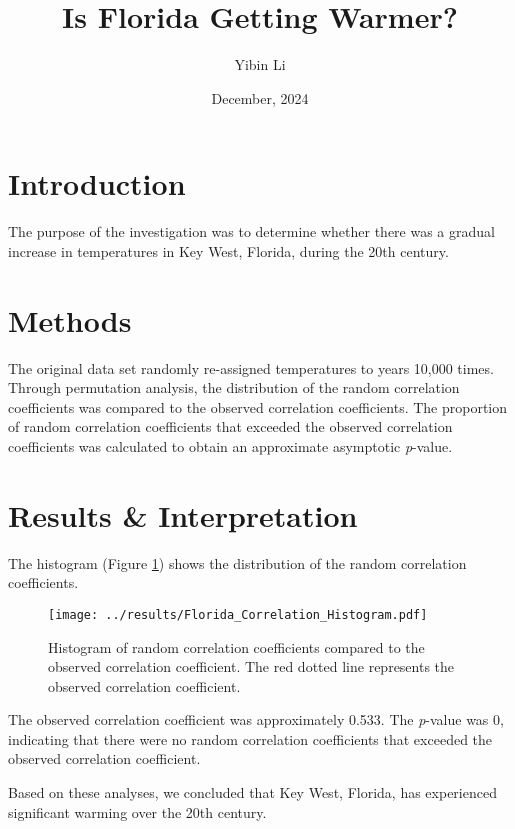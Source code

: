 \documentclass[a4paper]{article}
\title{\textbf{Is Florida Getting Warmer?}}
\author{Yibin Li}
\date{December, 2024}
\begin{document}
\maketitle

\section{Introduction}
The purpose of the investigation was to determine whether there was a gradual increase in temperatures in Key West, Florida, during the 20th century.

\section{Methods}
The original data set randomly re-assigned temperatures to years 10,000 times. Through permutation analysis, the distribution of the random correlation coefficients was compared to the observed correlation coefficients. The proportion of random correlation coefficients that exceeded the observed correlation coefficients was calculated to obtain an approximate asymptotic \textit{p}-value.

\section{Results \& Interpretation}
The histogram (Figure \ref{fig:correlation-histogram}) shows the distribution of the random correlation coefficients. 

\begin{figure}[H]
    \centering
    \texttt{[image: ../results/Florida\_Correlation\_Histogram.pdf]} 
    \captionsetup{font=footnotesize}
    \caption{Histogram of random correlation coefficients compared to the observed correlation coefficient. The red dotted line represents the observed correlation coefficient.}
    \label{fig:correlation-histogram}
\end{figure}

The observed correlation coefficient was approximately 0.533. The \textit{p}-value was 0, indicating that there were no random correlation coefficients that exceeded the observed correlation coefficient. 

Based on these analyses, we concluded that Key West, Florida, has experienced significant warming over the 20th century.
\end{document}

